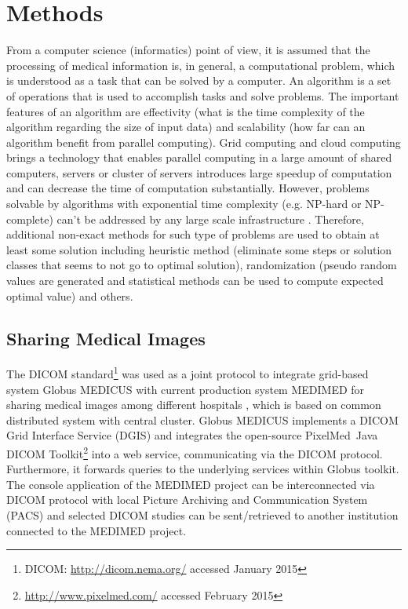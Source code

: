 \chapter{Methods}

From a computer science (informatics) point of view, it is assumed that the processing of medical information is, in general, a computational problem, which is understood as a task that can be solved by a computer. An algorithm is a set of operations that is used to accomplish tasks and solve problems. 
The important features of an algorithm are effectivity (what is the time complexity of the algorithm regarding the size of input data) and scalability (how far can an algorithm benefit from parallel computing). Grid computing and cloud computing brings a technology that enables parallel computing in a large amount of shared computers, servers or cluster of servers introduces large speedup of computation and can decrease the time of computation substantially. However, problems solvable by algorithms with exponential time complexity (e.g. NP-hard or NP-complete) can't be addressed by any large scale infrastructure \cite{Garey1979}. Therefore, additional non-exact methods for such type of problems are used to obtain at least some solution including heuristic method (eliminate some steps or solution classes that seems to not go to optimal solution), randomization (pseudo random values are generated and statistical methods can be used to compute expected optimal value) and others. 

\section{Sharing Medical Images}
The DICOM standard\footnote{DICOM: \url{http://dicom.nema.org/} accessed January 2015} was used as a joint protocol to integrate grid-based system Globus MEDICUS \cite{Erberich2006} with current production system MEDIMED for sharing medical images among different hospitals \cite{Slavicek2010}, which is based on common distributed system with central cluster. 
Globus MEDICUS \cite{Erberich2006,Erberich2007} implements a DICOM Grid Interface Service (DGIS) and integrates the open-source PixelMed\texttrademark ~Java DICOM Toolkit\footnote{\url{http://www.pixelmed.com/} accessed February 2015} into a web service, communicating via the DICOM protocol. Furthermore, it forwards queries to the underlying services within Globus toolkit. The console application of the MEDIMED project can be interconnected via DICOM protocol with local Picture Archiving and Communication System (PACS) and selected DICOM studies can be sent/retrieved to another institution connected to the MEDIMED project.





